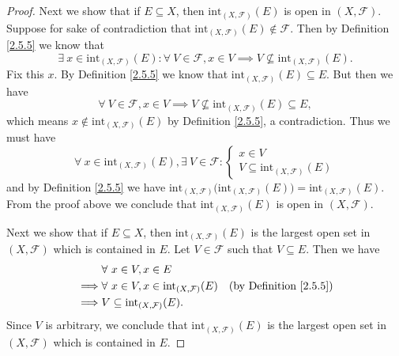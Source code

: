 \begin{proof}
    Next we show that if \(E \subseteq X\), then \(\text{int}_{(X, \mathcal{F})}(E)\) is open in \((X, \mathcal{F})\).
    Suppose for sake of contradiction that \(\text{int}_{(X, \mathcal{F})}(E) \notin \mathcal{F}\).
    Then by Definition \ref{2.5.5} we know that
    \[
        \exists\ x \in \text{int}_{(X, \mathcal{F})}(E) : \forall\ V \in \mathcal{F}, x \in V \implies V \not\subseteq \text{int}_{(X, \mathcal{F})}(E).
    \]
    Fix this \(x\).
    By Definition \ref{2.5.5} we know that \(\text{int}_{(X, \mathcal{F})}(E) \subseteq E\).
    But then we have
    \[
        \forall\ V \in \mathcal{F}, x \in V \implies V \not\subseteq \text{int}_{(X, \mathcal{F})}(E) \subseteq E,
    \]
    which means \(x \notin \text{int}_{(X, \mathcal{F})}(E)\) by Definition \ref{2.5.5}, a contradiction.
    Thus we must have
    \[
        \forall\ x \in \text{int}_{(X, \mathcal{F})}(E), \exists\ V \in \mathcal{F} : \begin{cases}
            x \in V \\
            V \subseteq \text{int}_{(X, \mathcal{F})}(E)
        \end{cases}
    \]
    and by Definition \ref{2.5.5} we have \(\text{int}_{(X, \mathcal{F})}\big(\text{int}_{(X, \mathcal{F})}(E)\big) = \text{int}_{(X, \mathcal{F})}(E)\).
    From the proof above we conclude that \(\text{int}_{(X, \mathcal{F})}(E)\) is open in \((X, \mathcal{F})\).

    Next we show that if \(E \subseteq X\), then \(\text{int}_{(X, \mathcal{F})}(E)\) is the largest open set in \((X, \mathcal{F})\) which is contained in \(E\).
    Let \(V \in \mathcal{F}\) such that \(V \subseteq E\).
    Then we have
    \begin{align*}
                 & \forall\ x \in V, x \in E                                                                     \\
        \implies & \forall\ x \in V, x \in \text{int}_{(X, \mathcal{F})}(E) & \text{(by Definition \ref{2.5.5})} \\
        \implies & V \subseteq \text{int}_{(X, \mathcal{F})}(E).
    \end{align*}
    Since \(V\) is arbitrary, we conclude that \(\text{int}_{(X, \mathcal{F})}(E)\) is the largest open set in \((X, \mathcal{F})\) which is contained in \(E\).


\end{proof}
